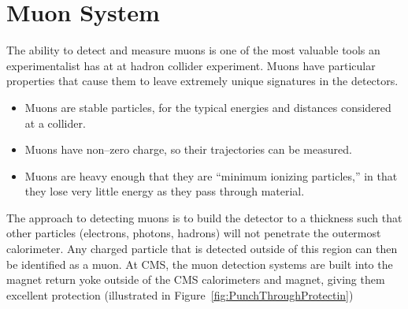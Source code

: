 \section{Muon System}
The ability to detect and measure muons is one of the most valuable tools an
experimentalist has at at hadron collider experiment.  Muons have particular
properties that cause them to leave extremely unique signatures in the detectors.
\begin{itemize}
  \item Muons are stable particles, for the typical energies and distances
    considered at a collider.
  \item Muons have non--zero charge, so their trajectories can be measured.
  \item Muons are heavy enough that they are ``minimum ionizing particles,'' in
    that they lose very little energy as they pass through material.
\end{itemize}
The approach to detecting muons is to build the detector to a thickness such
that other particles (electrons, photons, hadrons) will not penetrate the
outermost calorimeter.  Any charged particle that is detected outside of this
region can then be identified as a muon.  At CMS, the muon detection systems are
built into the magnet return yoke outside of the CMS calorimeters and magnet,
giving them excellent protection (illustrated in
Figure~\ref{fig:PunchThroughProtectin}) 
